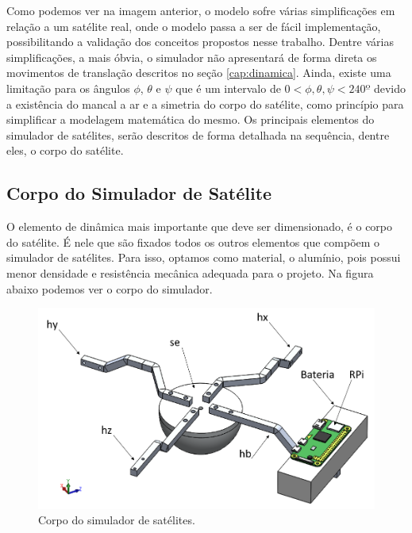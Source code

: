  Como podemos ver na imagem anterior, o modelo sofre várias simplificações em relação a um satélite real, onde o modelo passa a ser de fácil implementação, possibilitando a validação dos conceitos propostos nesse trabalho. Dentre várias simplificações, a mais óbvia, o simulador não apresentará de forma direta os movimentos de translação descritos no seção \ref{cap:dinamica}. Ainda, existe uma limitação para os ângulos $\phi$, $\theta$ e $\psi$ que é um intervalo de $0<\phi, \theta, \psi<240º$ devido a existência do mancal a ar e a simetria do corpo do satélite, como princípio para simplificar a modelagem matemática do mesmo. Os principais elementos do simulador de satélites, serão descritos de forma detalhada na sequência, dentre eles, o corpo do satélite.



\subsection{Corpo do Simulador de Satélite}

O elemento de dinâmica mais importante que deve ser dimensionado, é o corpo do satélite. É nele que são fixados todos os outros elementos que compõem o simulador de satélites. Para isso, optamos como material, o alumínio, pois possui menor densidade e resistência mecânica adequada para o projeto. Na figura abaixo podemos ver o corpo do simulador.

\begin{figure}[H]
  \caption{Corpo do simulador de satélites.}
  \begin{center}
      \includegraphics[scale=.4]{metodologia/img/corpo_satelite}
  \end{center}
  \label{fig:corpo_satelite}
\end{figure}


